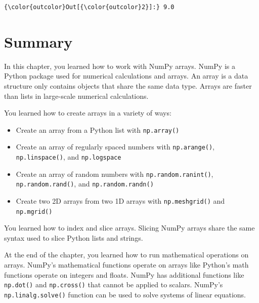\documentclass{book}
\providecommand{\tightlist}{%
      \setlength{\itemsep}{0pt}\setlength{\parskip}{0pt}}
\begin{document}
\begin{Verbatim}[commandchars=\\\{\}]
{\color{outcolor}Out[{\color{outcolor}2}]:} 9.0
\end{Verbatim}
            

    
        \newpage
        \section{Summary}\label{summary}

    




    
        In this chapter, you learned how to work with NumPy arrays. NumPy is a
Python package used for numerical calculations and arrays. An array is a
data structure only contains objects that share the same data type.
Arrays are faster than lists in large-scale numerical calculations.

You learned how to create arrays in a variety of ways:

\begin{itemize}
\tightlist
\item
  Create an array from a Python list with \lstinline!np.array()!
\item
  Create an array of regularly spaced numbers with
  \lstinline!np.arange()!, \lstinline!np.linspace()!, and
  \lstinline!np.logspace!
\item
  Create an array of random numbers with \lstinline!np.random.ranint()!,
  \lstinline!np.random.rand()!, and \lstinline!np.random.randn()!
\item
  Create two 2D arrays from two 1D arrays with \lstinline!np.meshgrid()!
  and \lstinline!np.mgrid()!
\end{itemize}

You learned how to index and slice arrays. Slicing NumPy arrays share
the same syntax used to slice Python lists and strings.

At the end of the chapter, you learned how to run mathematical
operations on arrays. NumPy's mathematical functions operate on arrays
like Python's math functions operate on integers and floats. NumPy has
additional functions like \lstinline!np.dot()! and
\lstinline!np.cross()! that cannot be applied to scalars. NumPy's
\lstinline!np.linalg.solve()! function can be used to solve systems of
linear equations.
    
\end{document}
